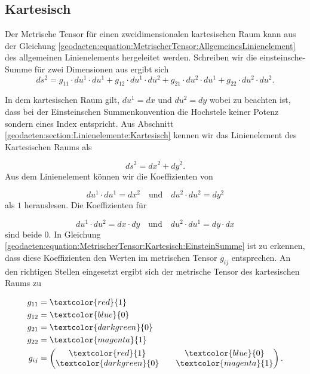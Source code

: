%
%
%
%
\subsection{Kartesisch\label{geodaeten:section:MetrischerTensor:Kartesisch}}

Der Metrische Tensor für einen zweidimensionalen kartesischen Raum kann aus der Gleichung \eqref{geodaeten:equation:MetrischerTensor:AllgemeinesLinienelement} des allgemeinen Linienelements hergeleitet werden.
Schreiben wir die einsteinsche-Summe für zwei Dimensionen aus ergibt sich
\begin{equation}
	ds^2 = g_{11} \cdot du^1 \cdot du^1 + g_{12} \cdot du^1 \cdot du^2 + g_{21} \cdot du^2 \cdot du^1 + g_{22} \cdot du^2 \cdot du^2 .
	\label{geodaeten:equation:MetrischerTensor:Kartesisch:EinsteinSumme}
\end{equation}

In dem kartesischen Raum gilt, $du^1 = dx$ und $du^2 = dy$ wobei zu beachten ist, dass bei der Einsteinschen Summenkonvention die Hochstele keiner Potenz sondern eines Index entspricht.
Aus Abschnitt \ref{geodaeten:section:Linienelemente:Kartesisch} kennen wir das Linienelement des Kartesischen Raums als

\begin{equation}
	ds^2 = dx^2 + dy^2 .
\end{equation}
Aus dem Linienelement können wir die Koeffizienten von 

\begin{equation}
du^1 \cdot du^1 = dx^2 \quad \text{und} \quad du^2 \cdot du^2 = dy^2 
\end{equation}
als $1$ herauslesen.
Die Koeffizienten für

\begin{equation}
du^1 \cdot du^2 = dx \cdot dy \quad \text{und} \quad du^2 \cdot du^1 = dy \cdot dx
\end{equation}
sind beide $0$.
In Gleichung \ref{geodaeten:equation:MetrischerTensor:Kartesisch:EinsteinSumme} ist zu erkennen, dass diese Koeffizienten den Werten im metrischen Tensor $g_{ij}$ entsprechen.
An den richtigen Stellen eingesetzt ergibt sich der metrische Tensor des kartesischen Raums zu

\begin{equation}
	\begin{aligned}
		g_{11} &= \textcolor{red}{1} \\
		g_{12} &= \textcolor{blue}{0} \\
		g_{21} &= \textcolor{darkgreen}{0} \\
		g_{22} &= \textcolor{magenta}{1} \\
		g_{ij} &= \begin{pmatrix} \textcolor{red}{1} && \textcolor{blue}{0} \\ \textcolor{darkgreen}{0} && \textcolor{magenta}{1} \end{pmatrix} .
	\end{aligned}
\end{equation}

